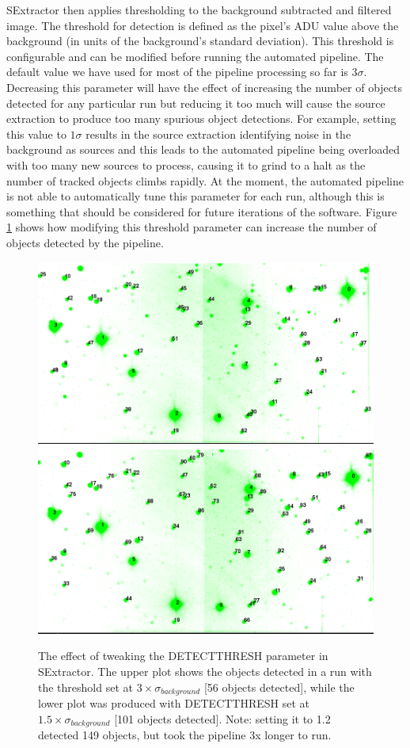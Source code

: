 SExtractor then applies thresholding to the background subtracted and filtered image. The threshold for detection is defined as the pixel's ADU value above the background (in units of the background's standard deviation). This threshold is configurable and can be modified before running the automated pipeline. The default value we have used for most of the pipeline processing so far is $3\sigma$. Decreasing this parameter will have the effect of increasing the number of objects detected for any particular run but reducing it too much will cause the source extraction to produce too many spurious object detections. For example, setting this value to $1\sigma$ results in the source extraction identifying noise in the background as sources and this leads to the automated pipeline being overloaded with too many new sources to process, causing it to grind to a halt as the number of tracked objects climbs rapidly. At the moment, the automated pipeline is not able to automatically tune this parameter for each run, although this is something that should be considered for future iterations of the software. Figure \ref{fig:tweakingthreshold} shows how modifying this threshold parameter can increase the number of objects detected by the pipeline.

\begin{figure}
  \centering
  \includegraphics[width=.8\linewidth]{images/2012-09-03_g_default.png}
  \includegraphics[width=.8\linewidth]{images/2012-09-03_g_15sigma.png}
  \caption{The effect of tweaking the DETECT\textunderscore THRESH parameter in SExtractor. The upper plot shows the objects detected in a run with the threshold set at $ 3\times \sigma_{background}$ [56 objects detected], while the lower plot was produced with DETECT\textunderscore THRESH set at $ 1.5\times \sigma_{background}$  [101 objects detected]. Note: setting it to 1.2 detected 149 objects, but took the pipeline 3x longer to run. }
\label{fig:tweakingthreshold}
\end{figure}

